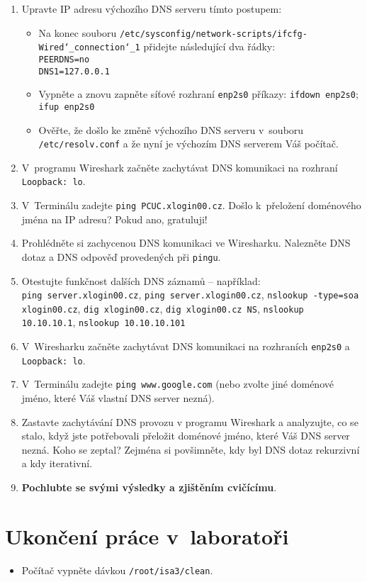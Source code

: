 \begin{enumerate}
  \item Upravte IP adresu výchozího DNS serveru tímto postupem:
  \begin{itemize}
    \item Na konec souboru {\tt /etc/sysconfig/network-scripts/ifcfg-Wired\char`_connection\char`_1} přidejte následující dva řádky:\\
          \verb|PEERDNS=no|\\
          \verb|DNS1=127.0.0.1|
    \item Vypněte a znovu zapněte síťové rozhraní {\tt enp2s0} příkazy: {\tt ifdown enp2s0}; {\tt ifup enp2s0}
    \item Ověřte, že došlo ke změně výchozího DNS serveru v~souboru {\tt /etc/resolv.conf} a že nyní je výchozím DNS serverem Váš počítač.
  \end{itemize}
  \item V~programu Wireshark začněte zachytávat DNS komunikaci na rozhraní {\tt Loopback: lo}.
  \item V~Terminálu zadejte {\tt ping PCUC.xlogin00.cz}. Došlo k~přeložení doménového jména na IP adresu? Pokud ano, gratuluji!
  \item Prohlédněte si zachycenou DNS komunikaci ve Wiresharku. Nalezněte DNS dotaz a DNS odpověď provedených při {\tt pingu}.
  \item Otestujte funkčnost dalších DNS záznamů -- například:\\
        {\tt ping server.xlogin00.cz}, {\tt ping server.xlogin00.cz}, {\tt nslookup -type=soa xlogin00.cz}, {\tt dig xlogin00.cz}, {\tt dig xlogin00.cz NS}, {\tt nslookup 10.10.10.1}, {\tt nslookup 10.10.10.101}
  \item V~Wiresharku začněte zachytávat DNS komunikaci na rozhraních {\tt enp2s0} a {\tt Loopback: lo}.
  \item V~Terminálu zadejte {\tt ping www.google.com} (nebo zvolte jiné doménové jméno, které Váš vlastní DNS server nezná).
  \item Zastavte zachytávání DNS provozu v programu Wireshark a analyzujte, co se stalo, když jste potřebovali přeložit doménové jméno, které Váš DNS server nezná. Koho se zeptal? Zejména si povšimněte, kdy byl DNS dotaz rekurzivní a kdy iterativní.
  \item {\bf Pochlubte se svými výsledky a zjištěním cvičícímu}.
\end{enumerate}




\section{Ukončení práce v~laboratoři}
\begin{itemize}
  \item Počítač vypněte dávkou {\tt /root/isa3/clean}.
\end{itemize}
